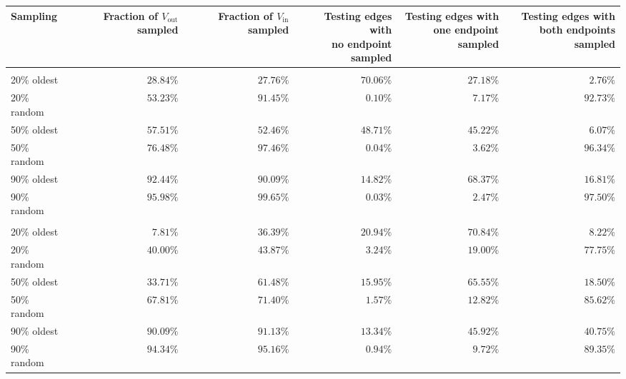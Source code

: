 \begin{center}
  \small
   \captionsetup{font=small}
   \captionof{table}{%
    The effect of not sampling edges at random on
  \wik{} and \epi{}. In case of random sampling, all values are averaged over 20 trials.
  Refer to the main text for an interpretation of how this affects the predictive performance.
\label{tab:troll_early_sampling}}
  \begin{longtable}{lrrrrr}
    \toprule
    Sampling &  \thead{Fraction of\\ $V_{\mathrm{out}}$ sampled} &
    \thead{Fraction of\\ $V_{\mathrm{in}}$ sampled} &
    \thead{Testing edges with\\ no endpoint sampled} &
    \thead{Testing edges with\\ one endpoint sampled} &
    \thead{Testing edges with\\ both endpoints sampled} \\
    \midrule
    & \multicolumn{5}{c}{\wik{}} \\
    \cmidrule(lr){2-6}
    20\% oldest & $28.84\%$ & $27.76\%$ & $70.06\%$ & $27.18\%$ & $2.76\%$  \\
    20\% random & $53.23\%$ & $91.45\%$ & $0.10\%$  & $7.17\%$  & $92.73\%$ \\
    \midrule
    50\% oldest & $57.51\%$ & $52.46\%$ & $48.71\%$ & $45.22\%$ & $6.07\%$  \\
    50\% random & $76.48\%$ & $97.46\%$ & $0.04\%$  & $3.62\%$  & $96.34\%$ \\
    \midrule
    90\% oldest & $92.44\%$ & $90.09\%$ & $14.82\%$ & $68.37\%$ & $16.81\%$ \\
    90\% random & $95.98\%$ & $99.65\%$ & $0.03\%$  & $2.47\%$  & $97.50\%$ \\
    & \multicolumn{5}{c}{\epi{}} \\
    \cmidrule(lr){2-6}
    20\% oldest & $7.81\%$  & $36.39\%$ & $20.94\%$ & $70.84\%$ & $8.22\%$  \\
    20\% random & $40.00\%$ & $43.87\%$ & $3.24\%$  & $19.00\%$ & $77.75\%$ \\
    \midrule
    50\% oldest & $33.71\%$ & $61.48\%$ & $15.95\%$ & $65.55\%$ & $18.50\%$ \\
    50\% random & $67.81\%$ & $71.40\%$ & $1.57\%$  & $12.82\%$ & $85.62\%$ \\
    \midrule
    90\% oldest & $90.09\%$ & $91.13\%$ & $13.34\%$ & $45.92\%$ & $40.75\%$ \\
    90\% random & $94.34\%$ & $95.16\%$ & $0.94\%$  & $9.72\%$  & $89.35\%$ \\
    \bottomrule
  \end{longtable}
\end{center}
